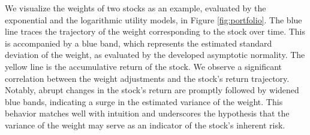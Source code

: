 \documentclass[aos]{imsart}
\numberwithin{equation}{section}
\theoremstyle{plain}
\begin{document}
We visualize the weights of two stocks as an example, evaluated by the exponential and the logarithmic utility models, in Figure \ref{fig:portfolio}. The blue line traces the trajectory of the weight corresponding to the stock over time. This is accompanied by a blue band, which represents the estimated standard deviation of the weight, as evaluated by the developed asymptotic normality. The yellow line is the accumulative return of the stock. 
We observe a significant correlation between the weight adjustments and the stock's return trajectory.
Notably, abrupt changes in the stock's return are promptly followed by widened blue bands, indicating a surge in the estimated variance of the weight.
This behavior matches well with intuition and underscores the hypothesis that the variance of the weight may serve as an indicator of the stock's inherent risk.
\end{document}
